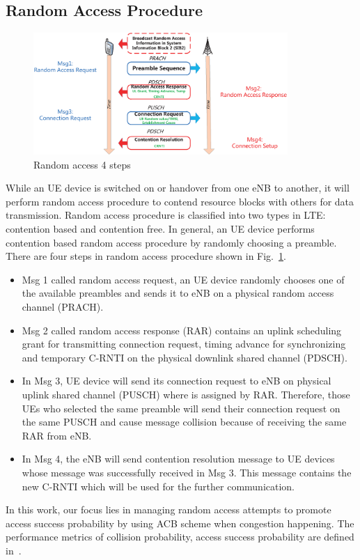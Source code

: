     \subsection{Random Access Procedure}
    \begin{figure}[t]
    \centering
    \includegraphics[width=3.8in]{fig_Rach_steps.eps}
    \caption{Random access 4 steps}
    \label{fig_RA_steps}
    \end{figure}

    While an UE device is switched on or handover from one eNB to another, it will perform random access procedure to contend resource blocks with others for data transmission. Random access procedure is classified into two types in LTE: contention based and contention free. In general, an UE device performs contention based random access procedure by randomly choosing a preamble. There are four steps in random access procedure shown in Fig.~\ref{fig_RA_steps}.

    \begin{itemize}
        \item
        Msg 1 called random access request, an UE device randomly chooses one of the available preambles and sends it to eNB on a physical random access channel (PRACH).
        \item 
        Msg 2 called random access response (RAR) contains an uplink scheduling grant for transmitting connection request, timing advance for synchronizing and temporary C-RNTI on the physical downlink shared channel (PDSCH).
        \item 
        In Msg 3, UE device will send its connection request to eNB on physical uplink shared channel (PUSCH) where is assigned by RAR. Therefore, those UEs who selected the same preamble will send their connection request on the same PUSCH and cause message collision because of receiving the same RAR from eNB.
        \item
        In Msg 4, the eNB will send contention resolution message to UE devices whose message was successfully received in Msg 3. This message contains the new C-RNTI which will be used for the further communication.
    \end{itemize}
    In this work, our focus lies in managing random access attempts to promote access success probability by using ACB scheme when congestion happening. The performance metrics of collision probability, access success probability are defined in~\cite{3GPP22.368}.


